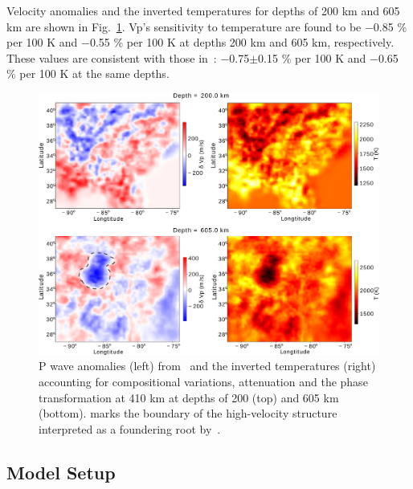 \documentclass[draft,linenumbers]{agujournal2018}
\begin{document}
Velocity anomalies and the inverted temperatures for depths of 200 km and 605 km are shown in Fig.~\ref{fig_temp}. 
Vp's sensitivity to temperature are found to be $-$0.85 \% per 100 K and $-$0.55 \% per 100 K at depths 200 km and 605 km, respectively. These values are consistent with those in~\citep{Cammarano2003}: $-$0.75$\pm$0.15 \% per 100 K and $-$0.65 \% per 100 K at the same depths. 
%
\begin{figure}[ht]
    \centering
    \includegraphics[width=0.75\linewidth]{figures/figure_temp.png}
    \caption{P wave anomalies (left) from~\citet{Byriol_2016} and the inverted temperatures (right) 
    accounting for compositional variations, attenuation and the phase transformation at 410 km  
    at depths of 200 (top) and 605 km (bottom).  marks the boundary of the high-velocity structure interpreted as a foundering root by~\citet{Biryol_2016}.
    }
    \label{fig_temp}
 \end{figure}

\subsection{Model Setup}
    
\end{document}
